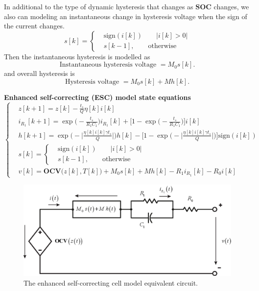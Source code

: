 \documentclass[11pt,a4paper,oneside]{book}
\numberwithin{equation}{section}
\newcommand{\abs}[1]{\big|#1\big|}
\newcommand{\sign}{\text{sign}}
\theoremstyle{it}
\theoremstyle{definition}
\begin{document}
In additional to the type of dynamic hysteresis that changes as $\mathbf{SOC}$ changes, we also can modeling an instantaneous change in hysteresis voltage when the sign of the current changes.
\begin{equation}
	s[k]=\left\lbrace \begin{aligned}
		&\sign(i[k]) \qquad\abs{i[k]>0} \\[6pt]
		&s[k-1], \qquad\text{otherwise}
	\end{aligned}\right. 
\end{equation}
Then the instantaneous hysteresis is modelled as
\begin{equation}
	\text{Instantaneous hysteresis voltage } = M_0s[k].
\end{equation}
and overall hysteresis is
\begin{equation}
	\text{Hysteresis voltage } = M_0s[k] + Mh[k].
\end{equation}

\begin{mybox}
	\textbf{Enhanced self-correcting (ESC) model state equations}
	\begin{equation}\label{lithium_ion_battery_model}
		\left\lbrace \begin{aligned}
			&	z[k+1] =z[k] -\frac{t_s}{Q}\eta[k]i[k] \\[6pt]
			&	i_{R_1}[k+1] = \exp\Big(-\frac{t_s}{R_1C_1}\Big)i_{R_1}[k]+\Big[1-\exp\Big(-\frac{t_s}{R_1C_1}\Big)\Big]i[k] \\[6pt]
			&	h[k+1] = \exp\Bigg(-\abs{\frac{\eta[k]i[k]\gamma t_s}{Q}}\Bigg)h[k] - \Bigg[1-\exp\Bigg(-\abs{\frac{\eta[k]i[k]\gamma t_s}{Q}}\Bigg)\Bigg]\sign(i[k]) \\[6pt]
			&	s[k]= \left\lbrace 
			\begin{aligned}
				& \sign(i[k]) \qquad\abs{i[k]>0} \\[6pt]
				& s[k-1], \qquad\text{otherwise}
			\end{aligned}\right.  \\[6pt]
			&	v[k] = \mathbf{OCV}\Big(z[k],T[k]\Big)+ M_0 s[k] + M h[k] -R_1i_{R_1}[k] - R_0i[k]
		\end{aligned}\right. 
	\end{equation}
	
	\begin{figure}[H]
		\centering
		\includegraphics[width = 360pt, angle = 0, keepaspectratio]{figures/lithium_ion_battery/cell_eq_circuit_4.eps}
		\captionsetup{width=0.5\textwidth, font=small}		
		\caption{The enhanced self-correcting cell model equivalent circuit.}
		\label{OCV_soc_5}
	\end{figure}
\end{mybox}
\end{document}
